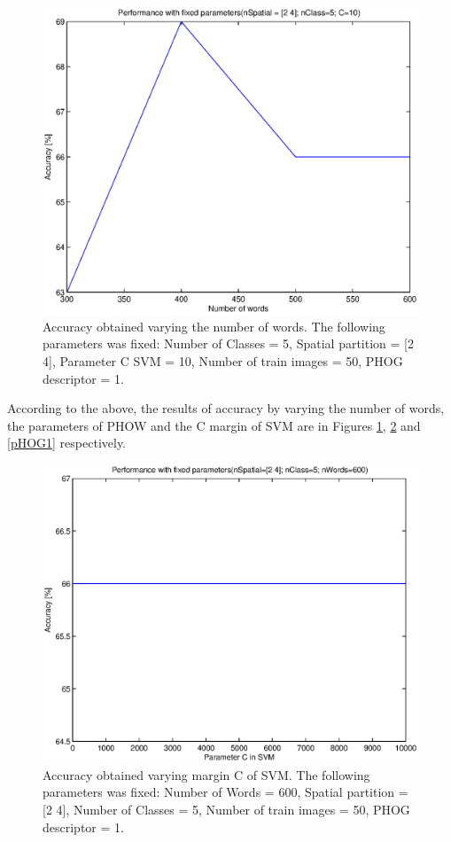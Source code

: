 \documentclass[10pt,twocolumn,letterpaper]{article}
\begin{document}
\begin{figure}[h]
\begin{center}
\includegraphics[width=1\linewidth]{images/nWords1.eps}
\end{center}
   \caption{
Accuracy obtained varying the number of words. The following parameters was fixed: Number of Classes = 5, Spatial partition = [2 4], Parameter C SVM = 10, Number of train images = 50, PHOG descriptor = 1.
   }
\label{nWords1}
\end{figure}

According to the above, the results of accuracy by varying the number of words, the parameters of PHOW and the C margin of SVM are in Figures \ref{nWords1}, \ref{C1} and \ref{pHOG1} respectively.

\begin{figure}[h]
\begin{center}
\includegraphics[width=1\linewidth]{images/C1.eps}
\end{center}
   \caption{
Accuracy obtained varying margin C of SVM. The following parameters was fixed: Number of Words = 600, Spatial partition = [2 4], Number of Classes = 5, Number of train images = 50, PHOG descriptor = 1.
   }
\label{C1}
\end{figure}
\end{document}
